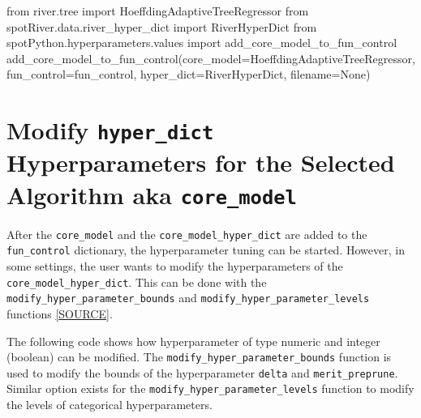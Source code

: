 \documentclass[
  letterpaper,
  DIV=11,
  numbers=noendperiod]{scrreprt}
\newenvironment{Shaded}{\begin{snugshade}}{\end{snugshade}}
\newcommand{\ImportTok}[1]{\textcolor[rgb]{0.00,0.46,0.62}{#1}}
\newcommand{\NormalTok}[1]{\textcolor[rgb]{0.00,0.23,0.31}{#1}}
\newcommand{\OperatorTok}[1]{\textcolor[rgb]{0.37,0.37,0.37}{#1}}
\newcommand{\VariableTok}[1]{\textcolor[rgb]{0.07,0.07,0.07}{#1}}
\begin{document}
\begin{Shaded}
\begin{Highlighting}[]
\ImportTok{from}\NormalTok{ river.tree }\ImportTok{import}\NormalTok{ HoeffdingAdaptiveTreeRegressor}
\ImportTok{from}\NormalTok{ spotRiver.data.river\_hyper\_dict }\ImportTok{import}\NormalTok{ RiverHyperDict}
\ImportTok{from}\NormalTok{ spotPython.hyperparameters.values }\ImportTok{import}\NormalTok{ add\_core\_model\_to\_fun\_control}
\NormalTok{add\_core\_model\_to\_fun\_control(core\_model}\OperatorTok{=}\NormalTok{HoeffdingAdaptiveTreeRegressor,}
\NormalTok{                              fun\_control}\OperatorTok{=}\NormalTok{fun\_control,}
\NormalTok{                              hyper\_dict}\OperatorTok{=}\NormalTok{RiverHyperDict,}
\NormalTok{                              filename}\OperatorTok{=}\VariableTok{None}\NormalTok{)}
\end{Highlighting}
\end{Shaded}

\hypertarget{modify-hyper_dict-hyperparameters-for-the-selected-algorithm-aka-core_model}{%
\section{\texorpdfstring{Modify \texttt{hyper\_dict} Hyperparameters for
the Selected Algorithm aka
\texttt{core\_model}}{Modify hyper\_dict Hyperparameters for the Selected Algorithm aka core\_model}}\label{modify-hyper_dict-hyperparameters-for-the-selected-algorithm-aka-core_model}}

After the \texttt{core\_model} and the \texttt{core\_model\_hyper\_dict}
are added to the \texttt{fun\_control} dictionary, the hyperparameter
tuning can be started. However, in some settings, the user wants to
modify the hyperparameters of the \texttt{core\_model\_hyper\_dict}.
This can be done with the \texttt{modify\_hyper\_parameter\_bounds} and
\texttt{modify\_hyper\_parameter\_levels} functions
\href{https://github.com/sequential-parameter-optimization/spotPython/blob/main/src/spotPython/hyperparameters/values.py}{{[}SOURCE{]}}.

The following code shows how hyperparameter of type numeric and integer
(boolean) can be modified. The \texttt{modify\_hyper\_parameter\_bounds}
function is used to modify the bounds of the hyperparameter
\texttt{delta} and \texttt{merit\_preprune}. Similar option exists for
the \texttt{modify\_hyper\_parameter\_levels} function to modify the
levels of categorical hyperparameters.
\end{document}
